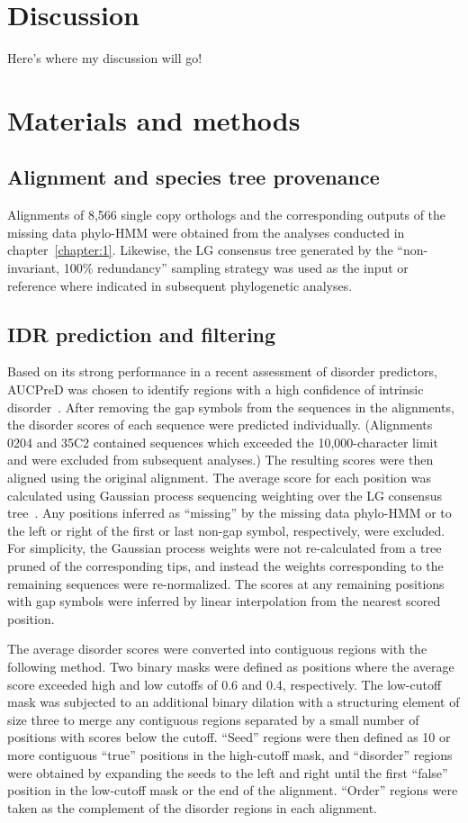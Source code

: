\section{Discussion}
Here's where my discussion will go!

\section{Materials and methods}

\subsection{Alignment and species tree provenance}
Alignments of 8,566 single copy orthologs and the corresponding outputs of the missing data phylo-HMM were obtained from the analyses conducted in chapter~\ref{chapter:1}. Likewise, the LG consensus tree generated by the ``non-invariant, 100\% redundancy'' sampling strategy was used as the input or reference where indicated in subsequent phylogenetic analyses.

\subsection{IDR prediction and filtering}
Based on its strong performance in a recent assessment of disorder predictors, AUCPreD was chosen to identify regions with a high confidence of intrinsic disorder~\cite{Wang2016, Necci2021}. After removing the gap symbols from the sequences in the alignments, the disorder scores of each sequence were predicted individually. (Alignments 0204 and 35C2 contained sequences which exceeded the 10,000-character limit and were excluded from subsequent analyses.) The resulting scores were then aligned using the original alignment. The average score for each position was calculated using Gaussian process sequencing weighting over the LG consensus tree~\cite{Altschul1989}. Any positions inferred as ``missing'' by the missing data phylo-HMM or to the left or right of the first or last non-gap symbol, respectively, were excluded. For simplicity, the Gaussian process weights were not re-calculated from a tree pruned of the corresponding tips, and instead the weights corresponding to the remaining sequences were re-normalized. The scores at any remaining positions with gap symbols were inferred by linear interpolation from the nearest scored position.

The average disorder scores were converted into contiguous regions with the following method. Two binary masks were defined as positions where the average score exceeded high and low cutoffs of 0.6 and 0.4, respectively. The low-cutoff mask was subjected to an additional binary dilation with a structuring element of size three to merge any contiguous regions separated by a small number of positions with scores below the cutoff. ``Seed'' regions were then defined as 10 or more contiguous ``true'' positions in the high-cutoff mask, and ``disorder'' regions were obtained by expanding the seeds to the left and right until the first ``false'' position in the low-cutoff mask or the end of the alignment. ``Order'' regions were taken as the complement of the disorder regions in each alignment.

